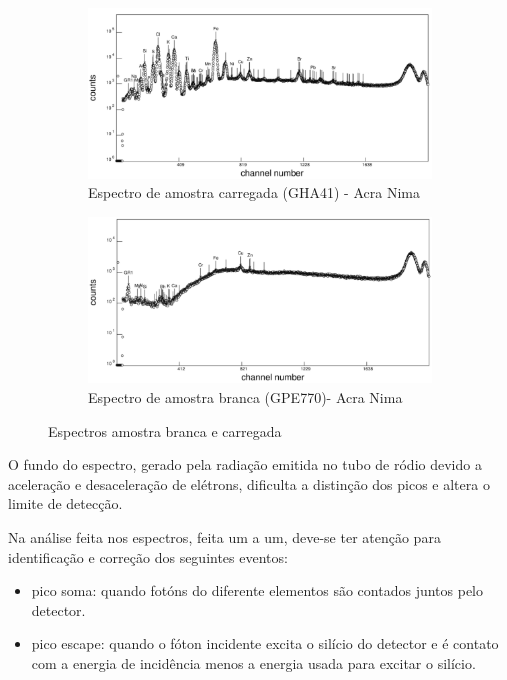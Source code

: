 \begin{figure}[H]
  \centering
  \begin{subfigure}[b]{0.7\textwidth}
    \includegraphics[width=\textwidth]{../inputs/images/winqxas/GHA41editado.pdf}
    \caption{Espectro de amostra carregada (GHA41) - Acra Nima}
  \end{subfigure}
  \begin{subfigure}[b]{0.7\textwidth}
    \includegraphics[width=\textwidth]{../inputs/images/winqxas/GPE770editado.pdf}
     \caption{Espectro de amostra branca (GPE770)- Acra Nima}
  \end{subfigure}
  \caption{Espectros amostra branca e carregada \label{fig:winqxas}}
\end{figure}

O fundo do espectro, gerado pela radiação emitida no tubo de ródio
devido a aceleração e desaceleração de elétrons, dificulta a distinção 
dos picos e altera o limite de detecção. 

Na análise feita nos espectros, feita um a um, deve-se ter atenção 
para identificação e correção dos seguintes eventos: 

\begin{itemize}
  \item pico soma: quando fotóns do diferente elementos são contados
        juntos pelo detector. 
  \item pico escape: quando o fóton incidente excita o silício do detector
        e é contato com a energia de incidência menos a energia usada para excitar o silício. 
\end{itemize}


